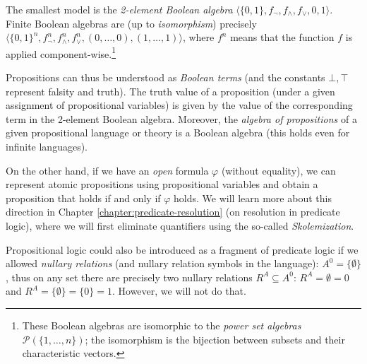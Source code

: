 The smallest model is the \emph{2-element Boolean algebra} $\langle \{0,1\},f_\neg,f_\land,f_\lor,0,1\rangle$. Finite Boolean algebras are (up to \emph{isomorphism}) precisely $\langle \{0,1\}^n,f_\neg^n,f_\land^n,f_\lor^n,(0,\dots,0),(1,\dots,1)\rangle$, where $f^n$ means that the function $f$ is applied component-wise.\footnote{These Boolean algebras are isomorphic to the \emph{power set algebras} $\mathcal P(\{1,\dots,n\})$; the isomorphism is the bijection between subsets and their characteristic vectors.}

Propositions can thus be understood as \emph{Boolean terms} (and the constants $\bot,\top$ represent falsity and truth). The truth value of a proposition (under a given assignment of propositional variables) is given by the value of the corresponding term in the 2-element Boolean algebra. Moreover, the \emph{algebra of propositions} of a given propositional language or theory is a Boolean algebra (this holds even for infinite languages).

On the other hand, if we have an \emph{open} formula $\varphi$ (without equality), we can represent atomic propositions using propositional variables and obtain a proposition that holds if and only if $\varphi$ holds. We will learn more about this direction in Chapter \ref{chapter:predicate-resolution} (on resolution in predicate logic), where we will first eliminate quantifiers using the so-called \emph{Skolemization}.

Propositional logic could also be introduced as a fragment of predicate logic if we allowed \emph{nullary relations} (and nullary relation symbols in the language): $A^0=\{\emptyset\}$, thus on any set there are precisely two nullary relations $R^A\subseteq A^0$: $R^A=\emptyset=0$ and $R^A=\{\emptyset\}=\{0\}=1$. However, we will not do that.
